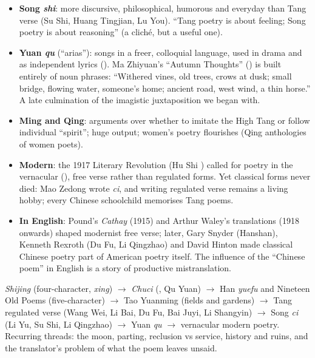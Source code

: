 \begin{itemize}
  \item \textbf{Song \emph{shi}}: more discursive, philosophical, humorous and everyday than
        Tang verse (Su Shi, Huang Tingjian, Lu You). ``Tang poetry is about feeling; Song
        poetry is about reasoning'' (a cliché, but a useful one).
  \item \textbf{Yuan \emph{qu}}  (``arias''): songs in a freer, colloquial language,
        used in drama and as independent lyrics (). Ma Zhiyuan's ``Autumn
        Thoughts'' () is built entirely of noun phrases:
         ``Withered vines, old trees,
        crows at dusk; small bridge, flowing water, someone's home; ancient road, west
        wind, a thin horse.'' A late culmination of the imagistic juxtaposition we began
        with.
  \item \textbf{Ming and Qing}: arguments over whether to imitate the High Tang or follow
        individual ``spirit''; huge output; women's poetry flourishes (Qing anthologies of
        women poets).
  \item \textbf{Modern}: the 1917 Literary Revolution (Hu Shi ) called for
        poetry in the vernacular (), free verse rather than regulated forms. Yet
        classical forms never died: Mao Zedong wrote \emph{ci}, and writing regulated verse
        remains a living hobby; every Chinese schoolchild memorises Tang poems.
  \item \textbf{In English}: Pound's \emph{Cathay} (1915) and Arthur Waley's translations
        (1918 onwards) shaped modernist free verse; later, Gary Snyder (Hanshan), Kenneth
        Rexroth (Du Fu, Li Qingzhao) and David Hinton made classical Chinese poetry part of
        American poetry itself. The influence of the ``Chinese poem'' in English is a
        story of productive mistranslation.
\end{itemize}

\begin{important}
\emph{Shijing} (four-character, \emph{xing}) $\to$ \emph{Chuci} (, Qu Yuan)
$\to$ Han \emph{yuefu} and Nineteen Old Poems (five-character) $\to$ Tao Yuanming (fields
and gardens) $\to$ Tang regulated verse (Wang Wei, Li Bai, Du Fu, Bai Juyi, Li Shangyin)
$\to$ Song \emph{ci} (Li Yu, Su Shi, Li Qingzhao) $\to$ Yuan \emph{qu} $\to$ vernacular
modern poetry. Recurring threads: the moon, parting, reclusion vs service, history and
ruins, and the translator's problem of what the poem leaves unsaid.
\end{important}

